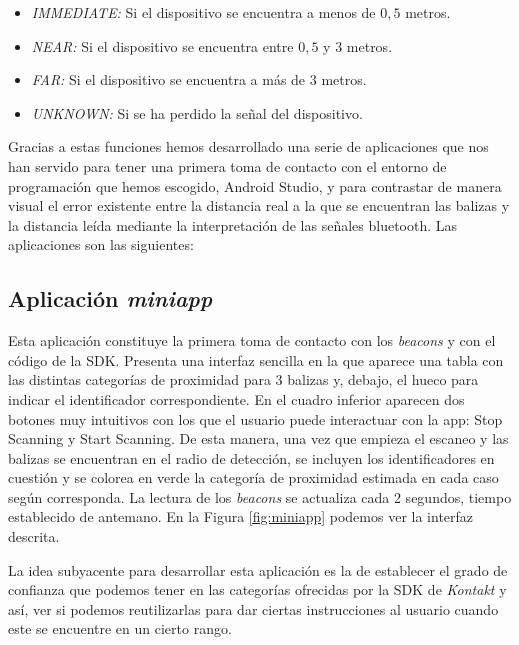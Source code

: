 \begin{itemize}
	\item \textit{IMMEDIATE:} Si el dispositivo se encuentra a menos de $0,5$ metros.
	\item \textit{NEAR:} Si el dispositivo se encuentra entre $0,5$ y $3$ metros.
	\item \textit{FAR:} Si el dispositivo se encuentra a más de $3$ metros.
	\item \textit{UNKNOWN:} Si se ha perdido la señal del dispositivo.
\end{itemize}

Gracias a estas funciones hemos desarrollado una serie de aplicaciones que nos han servido para tener una primera toma de contacto con el entorno de programación que hemos escogido, Android Studio, y para contrastar de manera visual el error existente entre la distancia real a la que se encuentran las balizas y la distancia leída mediante la interpretación de las señales bluetooth. Las aplicaciones son las siguientes:


\subsection{Aplicación \textit{miniapp}}
Esta aplicación constituye la primera toma de contacto con los \textit{beacons} y con el código de la SDK. Presenta una interfaz sencilla en la que aparece una tabla con las distintas categorías de proximidad para 3 balizas y, debajo, el hueco para indicar el identificador correspondiente. En el cuadro inferior aparecen dos botones muy intuitivos con los que el usuario puede interactuar con la app: Stop Scanning y Start Scanning. De esta manera, una vez que empieza el escaneo y las balizas se encuentran en el radio de detección, se incluyen los identificadores en cuestión y se colorea en verde la categoría de proximidad estimada en cada caso según corresponda. La lectura de los \textit{beacons} se actualiza cada 2 segundos, tiempo establecido de antemano. En la Figura \ref{fig:miniapp} podemos ver la interfaz descrita.

La idea subyacente para desarrollar esta aplicación es la de establecer el grado de confianza que podemos tener en las categorías ofrecidas por la SDK de \textit{Kontakt} y así, ver si podemos reutilizarlas para dar ciertas instrucciones al usuario cuando este se encuentre en un cierto rango. %

